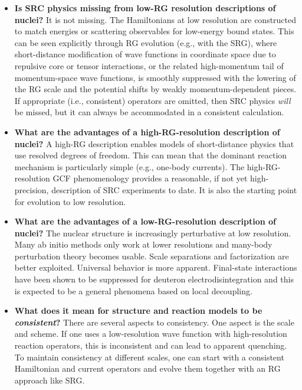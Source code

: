 \documentclass[10pt,aps,prc,floatfix,twocolumn,nofootinbib]{revtex4-1}
\begin{document}
\begin{itemize}
   \item\textbf{Is SRC physics missing from low-RG resolution descriptions of nuclei?}
   It is not missing. The Hamiltonians at low resolution are constructed to match energies or scattering observables for low-energy bound states. 
   This can be seen  explicitly through RG evolution (e.g., with the SRG), where short-distance modification of wave functions in coordinate space due to repulsive core or tensor interactions, or the related high-momentum tail of momentum-space wave functions, is smoothly suppressed with the lowering of the RG scale and the potential shifts by weakly momentum-dependent pieces.
   If appropriate (i.e., consistent) operators are omitted, then SRC physics \emph{will} be missed, but it can always be accommodated in a consistent calculation.

   \item\textbf{What are the advantages of a high-RG-resolution description of nuclei?}
   A high-RG description enables models of short-distance physics that use resolved degrees of freedom. 
   This can mean that the dominant reaction mechanism is particularly simple (e.g., one-body currents). 
  The high-RG-resolution GCF phenomenology provides a reasonable, if not yet high-precision, description of SRC experiments to date.
   It is also the starting point for evolution to low resolution. 

   \item\textbf{What are the advantages of a low-RG-resolution description of nuclei?}
   The nuclear structure is increasingly perturbative at low resolution. 
   Many ab initio methods only work at lower resolutions and many-body perturbation theory becomes usable. 
   Scale separations and factorization are better exploited. 
   Universal behavior is more apparent. 
   Final-state interactions have been shown to be suppressed for deuteron electrodisintegration and this is expected to be a general phenomena based on local decoupling.
   
   \item\textbf{What does it mean for structure and reaction models to be \emph{consistent}?}
   There are several aspects to consistency. 
   One aspect is the scale and scheme. 
   If one uses a low-resolution wave function with high-resolution reaction operators, this is inconsistent and can lead to apparent quenching. 
   To maintain consistency at different scales, one can start with a consistent Hamiltonian and current operators and evolve them together with an RG approach like SRG.


\end{itemize}
\end{document}
